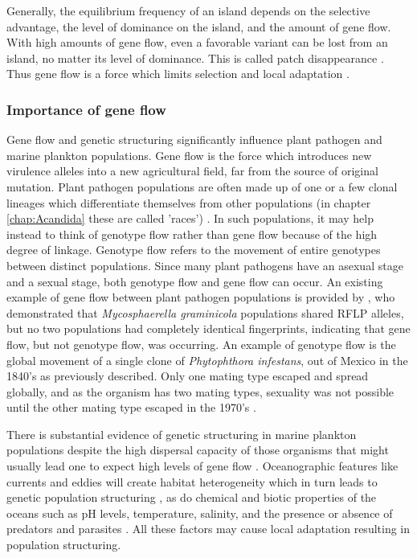 Generally, the equilibrium frequency of an island depends on the selective advantage, the level of dominance on the island, and the amount of gene flow.
With high amounts of gene flow, even a favorable variant can be lost from an island, no matter its level of dominance.
This is called patch disappearance \parencite{Haldane1948}.
Thus gene flow is a force which limits selection and local adaptation \parencite{Lenormand2002}.


\subsubsection{Importance of gene flow}

Gene flow and genetic structuring significantly influence plant pathogen and marine plankton populations.
Gene flow is the force which introduces new virulence alleles into a new agricultural field, far from the source of original mutation.
Plant pathogen populations are often made up of one or a few clonal lineages which differentiate themselves from other populations (in chapter \ref{chap:Acandida} these are called 'races') \parencite{Koenig1997}.
In such populations, it may help instead to think of genotype flow rather than gene flow because of the high degree of linkage.
Genotype flow refers to the movement of entire genotypes between distinct populations.
Since many plant pathogens have an asexual stage and a sexual stage, both genotype flow and gene flow can occur.
An existing example of gene flow between plant pathogen populations is provided by \cite{Zhan2003a}, who demonstrated that \textit{Mycosphaerella graminicola} populations shared RFLP alleles, but no two populations had completely identical fingerprints, indicating that gene flow, but not genotype flow, was occurring.
An example of genotype flow is the global movement of a single clone of \textit{Phytophthora infestans}, out of Mexico in the 1840's as previously described.
Only one mating type escaped and spread globally, and as the organism has two mating types, sexuality was not possible until the other mating type escaped in the 1970's \parencite{Goodwin1992,Goodwin1994,Goodwin1995}.

There is substantial evidence of genetic structuring in marine plankton populations despite the high dispersal capacity of those organisms that might usually lead one to expect high levels of gene flow \parencite{Sildever2016}.
Oceanographic features like currents and eddies will create habitat heterogeneity which in turn leads to genetic population structuring \parencite{White2010,Sanford2011,Casabianca2012}, as do chemical and biotic properties of the oceans such as pH levels, temperature, salinity, and the presence or absence of predators and parasites \parencite{Cousyn2001,Decaestecker2007,Weisse2007,Yampolsky2014,Defaveri2014}.
All these factors may cause local adaptation resulting in population structuring.
